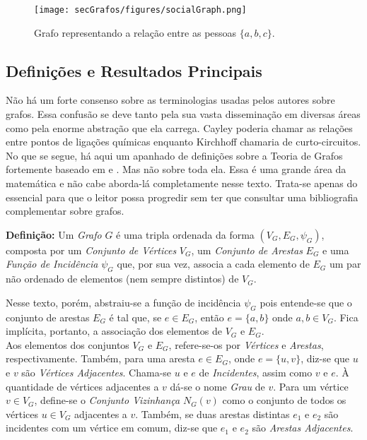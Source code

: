 \begin{figure}[H]
	\begin{center}
		\texttt{[image: secGrafos/figures/socialGraph.png]}
	\end{center}
	\caption{Grafo representando a relação entre as pessoas $\{a, b, c\}$.}
	\label{fig:socialGraph}
\end{figure}

\subsection{Definições e Resultados Principais}

Não há um forte consenso sobre as terminologias usadas pelos autores sobre grafos. Essa confusão se deve tanto pela sua vasta disseminação em diversas áreas como pela enorme abstração que ela carrega. Cayley poderia chamar as relações entre pontos de ligações químicas enquanto Kirchhoff chamaria de curto-circuitos.
No que se segue, há aqui um apanhado de definições sobre a Teoria de Grafos fortemente baseado em \cite{graphTheoryFHarary} e \cite{graphTheoryApplicationsBondy}. Mas não sobre toda ela. Essa é uma grande área da matemática e não cabe aborda-lá completamente nesse texto. Trata-se apenas do essencial para que o leitor possa progredir sem ter que consultar uma bibliografia complementar sobre grafos.

\begin{center}
	\begin{minipage}{0.9 \linewidth}
		\textbf{Definição:} Um \textit{Grafo} $G$ é uma tripla ordenada da forma $(V_G,E_G, \psi_{G})$, composta por um \textit{Conjunto de Vértices} $V_G$, um \textit{Conjunto de Arestas} $E_G$ e uma \textit{Função de Incidência} $\psi_{G}$ que, por sua vez, associa a cada elemento de $E_G$ um par não ordenado de elementos (nem sempre distintos) de $V_G$.
	\end{minipage}
\end{center} 

Nesse texto, porém, abstraiu-se a função de incidência $\psi_G$ pois entende-se que o conjunto de arestas $E_G$ é tal que, se $e \in E_G$, então $e = \{a, b\}$ onde $a, b \in V_G$. Fica implícita, portanto, a associação dos elementos de  $V_G$ e $E_G$.
\\

Aos elementos dos conjuntos $V_G$ e $E_G$, refere-se-os por \textit{Vértices} e \textit{Arestas}, respectivamente. Também, para uma aresta $e \in E_G$, onde $e = \{u, v\}$, diz-se que $u$ e $v$ são \textit{Vértices Adjacentes}. Chama-se $u$ e $e$ de \textit{Incidentes}, assim como $v$ e $e$. À quantidade de vértices adjacentes a $v$ dá-se o nome \textit{Grau} de $v$. Para um vértice $v\in V_G$, define-se o \textit{Conjunto Vizinhança} $N_G(v)$ como o conjunto de todos os vértices $u\in V_G$ adjacentes a $v$. Também, se duas arestas distintas $e_1$ e $e_2$ são incidentes com um vértice em comum, diz-se que $e_1$ e $e_2$ são \textit{Arestas Adjacentes}. 
\\


